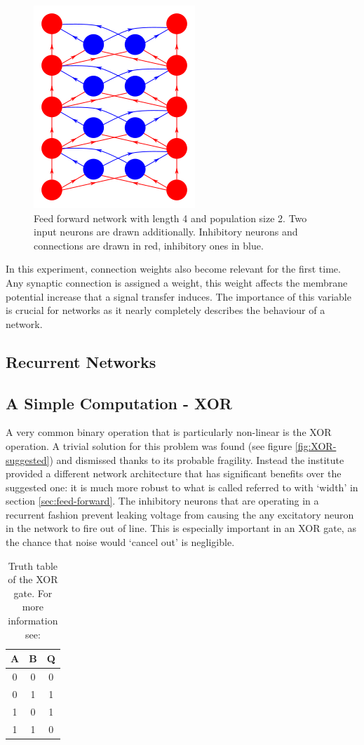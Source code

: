 \documentclass[10pt,a4paper]{article}
\begin{document}
\begin{figure}
    \centering
    \includegraphics[width=.3\textwidth]{figures/feedforward-real.png}
    \caption{Feed forward network with length 4 and population size 2. Two input
        neurons are drawn additionally. Inhibitory neurons and connections are drawn
        in red, inhibitory ones in blue.}
    \label{fig:feed-forward}
\end{figure}

In this experiment, connection weights also become relevant for the first time.
Any synaptic connection is assigned a weight, this weight affects the
membrane potential increase that a signal transfer induces. The importance of
this variable is crucial for networks as it nearly completely describes the
behaviour of a network.

\subsection{Recurrent Networks}

\subsection{A Simple Computation - XOR}
A very common binary operation that is particularly non-linear is the XOR
operation\cite{horowitz_hill_2020}. A trivial solution for this problem was
found (see figure \ref{fig:XOR-suggested}) and dismissed thanks to its probable
fragility. Instead the institute provided a different network architecture that
has significant benefits over the suggested one: it is much more robust to what
is called referred to with `width' in section \ref{sec:feed-forward}. The
inhibitory neurons that are operating in a recurrent fashion prevent leaking
voltage from causing the any excitatory neuron in the network to fire out of
line. This is especially important in an XOR gate, as the chance that noise
would `cancel out' is negligible.
\begin{table}[ht]
    \centering
    \begin{tabular}{c | c | c}
        A & B & Q \\ \hline
        0 & 0 & 0 \\
        0 & 1 & 1 \\
        1 & 0 & 1 \\
        1 & 1 & 0
    \end{tabular}
    \caption{Truth table of the XOR gate. For more information see:
    \cite{horowitz_hill_2020}}
    \label{tab:XOR}
\end{table}
\end{document}
